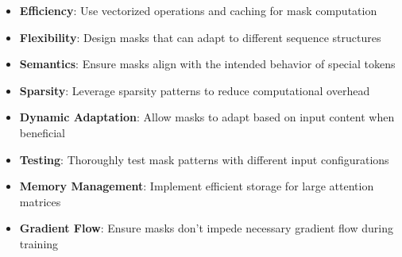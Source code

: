 \begin{itemize}
\item \textbf{Efficiency}: Use vectorized operations and caching for mask computation
\item \textbf{Flexibility}: Design masks that can adapt to different sequence structures
\item \textbf{Semantics}: Ensure masks align with the intended behavior of special tokens
\item \textbf{Sparsity}: Leverage sparsity patterns to reduce computational overhead
\item \textbf{Dynamic Adaptation}: Allow masks to adapt based on input content when beneficial
\item \textbf{Testing}: Thoroughly test mask patterns with different input configurations
\item \textbf{Memory Management}: Implement efficient storage for large attention matrices
\item \textbf{Gradient Flow}: Ensure masks don't impede necessary gradient flow during training
\end{itemize}
\begin{comment}
Feedback: This is a good list. To make it more actionable:
1.  **Efficiency**: "Always create your attention masks using tensor operations (e.g., in PyTorch or TensorFlow). Avoid iterating and building masks in Python loops, as this will be a major performance bottleneck."
2.  **Testing**: "Attention masks are a common source of bugs. Create a dedicated unit test for your masking logic. A good test will create a small, predictable input sequence with your special tokens and assert that the resulting mask has the exact pattern of zeros and ones that you expect."
3.  **Sparsity**: "If your custom mask is very sparse (mostly zeros), consider using a sparse matrix representation or a specialized library like `torch.sparse` to significantly reduce memory usage and potentially speed up computation on compatible hardware."
\end{comment}
